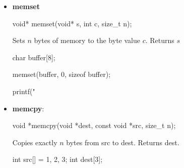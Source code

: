 \documentclass{report}
\begin{document}
    \pagebreak 
    \begin{itemize}
        \item \textbf{memset}        
            \bigbreak \noindent 
            \begin{cppcode}
            void* memset(void* s, int c, size_t n);
            \end{cppcode}
            \bigbreak \noindent 
            Sets $n$ bytes of memory to the byte value $c$.
            \bigbreak \noindent 
            Returns $s$
            \bigbreak \noindent 
            \begin{cppcode}
                char buffer[8];

                memset(buffer, 0, sizeof buffer);

                printf("%
            \end{cppcode}
        \item \textbf{memcpy}: 
            \bigbreak \noindent 
            \begin{cppcode}
            void *memcpy(void *dest, const void *src, size_t n);
            \end{cppcode}
            \bigbreak \noindent 
            Copies exactly $n$ bytes from src to dest.
            \bigbreak \noindent 
            Returns dest.
            \bigbreak \noindent 
            \begin{cppcode}
                    int src[] = {1, 2, 3};
                    int dest[3];


\end{cppcode}
\end{itemize}
\end{document}
